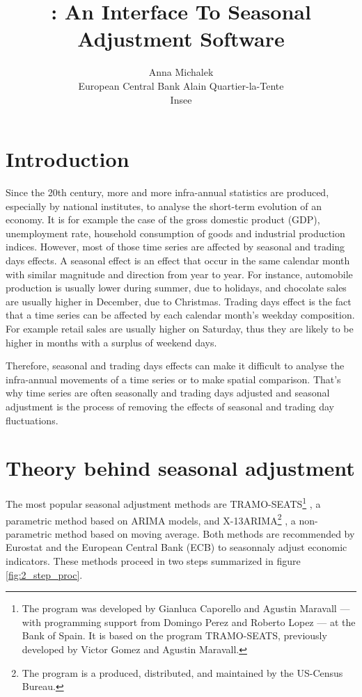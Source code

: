 \documentclass[article]{jss}
\author{
Anna Michalek\\European Central Bank \And Alain Quartier-la-Tente\\Insee
}
\title{\pkg{RJDemetra}: An \proglang{R} Interface To \proglang{JDemetra+}
Seasonal Adjustment Software}
\begin{document}
\hypertarget{introduction}{%
\section{Introduction}\label{introduction}}

Since the 20th century, more and more infra-annual statistics are
produced, especially by national institutes, to analyse the short-term
evolution of an economy. It is for example the case of the gross
domestic product (GDP), unemployment rate, household consumption of
goods and industrial production indices. However, most of those time
series are affected by seasonal and trading days effects. A seasonal
effect is an effect that occur in the same calendar month with similar
magnitude and direction from year to year. For instance, automobile
production is usually lower during summer, due to holidays, and
chocolate sales are usually higher in December, due to Christmas.
Trading days effect is the fact that a time series can be affected by
each calendar month's weekday composition. For example retail sales are
usually higher on Saturday, thus they are likely to be higher in months
with a surplus of weekend days.

Therefore, seasonal and trading days effects can make it difficult to
analyse the infra-annual movements of a time series or to make spatial
comparison. That's why time series are often seasonally and trading days
adjusted and seasonal adjustment is the process of removing the effects
of seasonal and trading day fluctuations.

\hypertarget{theory-behind-seasonal-adjustment}{%
\section{Theory behind seasonal
adjustment}\label{theory-behind-seasonal-adjustment}}

The most popular seasonal adjustment methods are TRAMO-SEATS\footnote{The
  program  was developed by Gianluca Caporello and
  Agustin Maravall --- with programming support from Domingo Perez and
  Roberto Lopez --- at the Bank of Spain. It is based on the program
  TRAMO-SEATS, previously developed by Victor Gomez and Agustin
  Maravall.} \citep{gomez1996programs, caporello2004program}, a
parametric method based on ARIMA models, and X-13ARIMA\footnote{The
  program  is a produced, distributed, and
  maintained by the US-Census Bureau.}
\citep{findleyx12, ladiray1999x11en}, a non-parametric method based on
moving average. Both methods are recommended by Eurostat and the
European Central Bank (ECB) to seasonnaly adjust economic indicators.
These methods proceed in two steps summarized in figure
\ref{fig:2_step_proc}.
\end{document}
